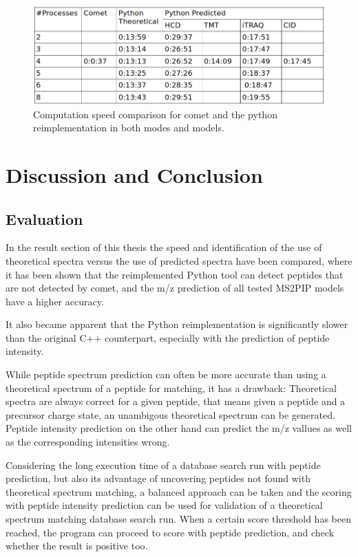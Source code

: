 \documentclass[11pt]{article}
\begin{document}
\begin{figure}
\centering
\includegraphics[width=1\textwidth]{figs/speed-comparison.png}
\caption{Computation speed comparison for comet and the python reimplementation in both modes and models.}
\label{fig:speed-comparison}
\end{figure}

\newpage

\section{Discussion and Conclusion}
\subsection{Evaluation}
In the result section of this thesis the speed and identification of the use of theoretical spectra versus the use of predicted spectra have been compared, where it has been shown that the reimplemented Python tool can detect peptides that are not detected by comet, and the m/z prediction of all tested MS2PIP models have a higher accuracy.

It also became apparent that the Python reimplementation is significantly slower than the original C++ counterpart, especially with the prediction of peptide intensity.

While peptide spectrum prediction can often be more accurate than using a theoretical spectrum of a peptide for matching,
it has a drawback: Theoretical spectra are always correct for a given peptide, that means given a peptide and a precursor charge state, an unambigous theoretical spectrum can be generated. Peptide intensity prediction on the other hand can predict the m/z vallues as well as the corresponding intensities wrong.

Considering the long execution time of a database search run with peptide prediction, but also its advantage of uncovering peptides not found with theoretical spectrum matching, a balanced approach can be taken and the scoring with peptide intensity prediction can be used for validation of a theoretical spectrum matching database search run. When a certain score threshold has been reached, the program can proceed to score with peptide prediction, and check whether the result is positive too.
\end{document}
